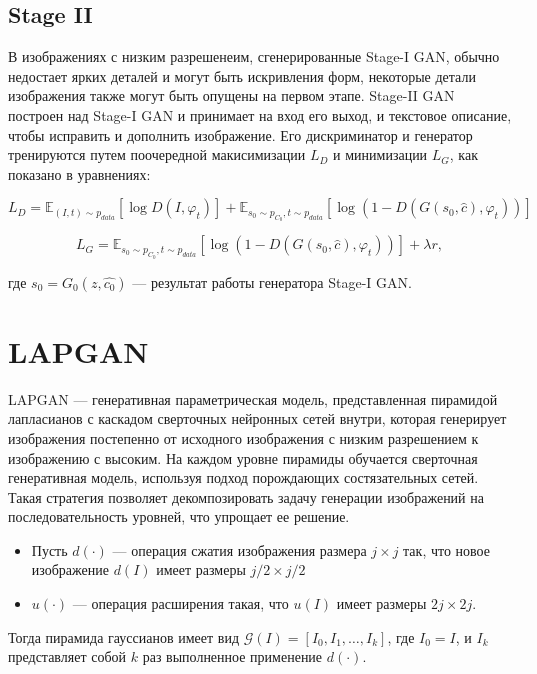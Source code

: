 \documentclass{article}
\renewcommand{\phi}{\varphi}
\theoremstyle{definition}
\theoremstyle{theorem}
\theoremstyle{remark}
\theoremstyle{theorem}
\theoremstyle{example}
\theoremstyle{theorem}
\theoremstyle{theorem}
\theoremstyle{theorem}
\theoremstyle{theorem}
\begin{document}
\subsection{Stage II}

В изображениях с низким разрешенеим, сгенерированные Stage-I GAN, обычно недостает ярких деталей и могут быть искривления форм, некоторые детали изображения также могут быть опущены на первом этапе. Stage-II GAN построен над Stage-I GAN и принимает на вход его выход, и текстовое описание, чтобы исправить и дополнить изображение. Его дискриминатор и генератор тренируются путем поочередной макисимизации $L_D$ и минимизации $L_G$, как показано в уравнениях:

$$ L_{D} = \mathbb{E}_{\left(I, t\right)\sim p_{data}} [\log D (I,\phi_t)] +  \mathbb{E}_{s_0\sim p_{C_0}, t\sim p_{data}} [\log (1- D(G(s_0,\hat{c}), \phi_t))] $$

$$  L_{G} =   \mathbb{E}_{s_0\sim p_{C_0}, t\sim p_{data}}  \left[\log \left(1- D\left(G(s_0,\hat{c}), \phi_t\right)\right)\right] + \lambda r ,$$

где $s_0 = G_0\left(z, \hat{c_0}\right)$ --- результат работы генератора Stage-I GAN.

\section{LAPGAN}

LAPGAN --- генеративная параметрическая модель, представленная пирамидой лапласианов с каскадом сверточных нейронных сетей внутри, которая генерирует изображения постепенно от исходного изображения с низким разрешением к изображению с высоким. На каждом уровне пирамиды обучается сверточная генеративная модель, используя подход порождающих состязательных сетей. Такая стратегия позволяет декомпозировать задачу генерации изображений на последовательность уровней, что упрощает ее решение.

\begin{itemize}
	\item Пусть $d(\cdot)$ --- операция сжатия изображения размера $j\times j$ так, что новое изображение $d(I)$ имеет размеры $j/2 \times j/2$
	\item $u(\cdot)$ --- операция расширения такая, что $u(I)$ имеет размеры $2j \times 2j$.
\end{itemize}

Тогда пирамида гауссианов имеет вид $\mathcal{G}(I) = \left[I_0,I_1,\ldots, I_k\right]$, где $I_0 = I$, и $I_k$ представляет собой $k$ раз выполненное применение $d(\cdot)$.
\end{document}
